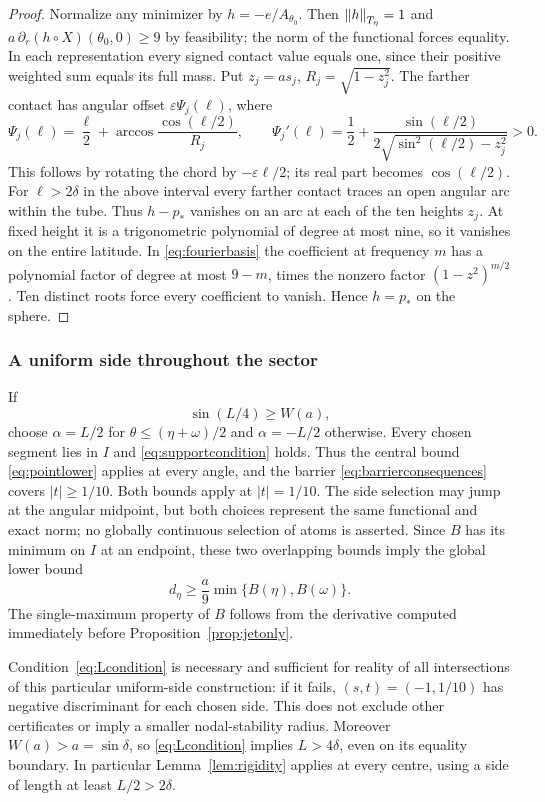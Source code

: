 \documentclass[11pt,a4paper]{article}
\begin{document}
\begin{proof}
Normalize any minimizer by $h=-e/A_{\theta_0}$. Then
$\left\lVert h\right\rVert_{T_\eta}=1$ and $a\,\partial_r(h\circ X)(\theta_0,0)\ge9$ by feasibility;
the norm of the functional forces equality.
In each representation every signed contact value equals one,
since their positive weighted sum equals its full mass.
Put $z_j=as_j$, $R_j=\sqrt{1-z_j^2}$. The farther contact
has angular offset $\varepsilon\Psi_j(\ell)$, where
\[
 \Psi_j(\ell)=\frac{\ell}{2}
     +\arccos\frac{\cos(\ell/2)}{R_j},\qquad
 \Psi_j'(\ell)=\frac12+
   \frac{\sin(\ell/2)}{2\sqrt{\sin^2(\ell/2)-z_j^2}}>0.
\]
This follows by rotating the chord by $-\varepsilon\ell/2$;
its real part becomes $\cos(\ell/2)$.
For $\ell>2\delta$ in the above interval every farther contact
traces an open angular arc within the tube. Thus $h-p_*$
vanishes on an arc at each of the ten heights $z_j$.
At fixed height it is a trigonometric polynomial of degree at
most nine, so it vanishes on the entire latitude.
In \eqref{eq:fourierbasis} the coefficient at frequency $m$
has a polynomial factor of degree at most $9-m$, times the
nonzero factor $(1-z^2)^{m/2}$. Ten distinct roots force every
coefficient to vanish. Hence $h=p_*$ on the sphere.
\end{proof}

\subsubsection{A uniform side throughout the sector}
If
\begin{equation}\label{eq:Lcondition}
 \sin(L/4)\ge W(a),
\end{equation}
choose $\alpha=L/2$ for $\theta\le(\eta+\omega)/2$ and
$\alpha=-L/2$ otherwise. Every chosen segment lies in $I$ and
\eqref{eq:supportcondition} holds. Thus the central bound
\eqref{eq:pointlower} applies at every angle, and the barrier
\eqref{eq:barrierconsequences} covers $|t|\ge1/10$. Both bounds
apply at $|t|=1/10$. The side selection may jump at the angular
midpoint, but both choices represent the same functional and exact norm;
no globally continuous selection of atoms is asserted.
Since $B$ has its minimum on $I$ at an endpoint, these two overlapping
bounds imply the global lower bound
\begin{equation}\label{eq:Llower}
 d_\eta\ge\frac a9\min\{B(\eta),B(\omega)\}.
\end{equation}
The single-maximum property of $B$ follows from the derivative
computed immediately before Proposition~\ref{prop:jetonly}.

Condition~\eqref{eq:Lcondition} is necessary and sufficient for reality
of all intersections of this particular uniform-side construction:
if it fails, $(s,t)=(-1,1/10)$ has negative discriminant for each
chosen side. This does not exclude other certificates or imply a
smaller nodal-stability radius. Moreover $W(a)>a=\sin\delta$, so
\eqref{eq:Lcondition} implies $L>4\delta$, even on its equality
boundary. In particular Lemma~\ref{lem:rigidity} applies at
every centre, using a side of length at least $L/2>2\delta$.
\end{document}
